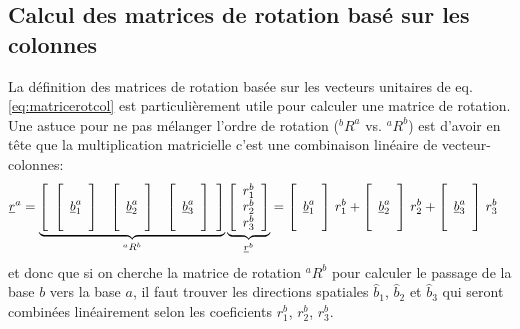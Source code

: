 \subsection{Calcul des matrices de rotation basé sur les colonnes}
\label{sec:calmat}

La définition des matrices de rotation basée sur les vecteurs unitaires de eq.\eqref{eq:matricerotcol} est particulièrement utile pour calculer une matrice de rotation. Une astuce pour ne pas mélanger l'ordre de rotation ($^bR^a$ vs. $^aR^b$) est d'avoir en tête que la multiplication matricielle c'est une combinaison linéaire de vecteur-colonnes:
\begin{align}
\underline{r}^a &= 
\underbrace{ \left[ \begin{array}{c c c} 
	\left[ \begin{array}{c} \\ \underline{b}_1^a \\  \\ \end{array}  \right] & \left[ \begin{array}{c} \\ \underline{b}_2^a \\  \\ \end{array}  \right] & \left[ \begin{array}{c} \\ \underline{b}_3^a \\  \\ \end{array}  \right]
\end{array} \right] }_{^aR^b}
\underbrace{ \left[ \begin{array}{c} r_1^b \\ r_2^b \\ r_3^b  \end{array} \right] }_{\underline{r}^b}
= 
\left[ \begin{array}{c} \\ \underline{b}_1^a \\  \\ \end{array}  \right] \, r_1^b + \left[ \begin{array}{c} \\ \underline{b}_2^a \\  \\ \end{array}  \right]\, r_2^b + \left[ \begin{array}{c} \\ \underline{b}_3^a \\  \\ \end{array}  \right] \, r_3^b 
\end{align}
et donc que si on cherche la matrice de rotation ${}^aR^b$ pour calculer le passage de la base $b$ vers la base $a$, il faut trouver les directions spatiales $\hat{b}_1$, $\hat{b}_2$ et $\hat{b}_3$ qui seront combinées linéairement selon les coeficients $r_1^b$, $r_2^b$, $r_3^b$. 

